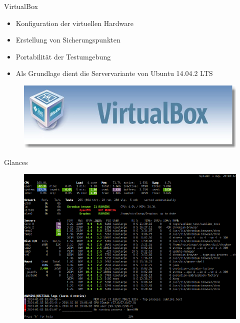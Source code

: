 \documentclass[10pt]{beamer}
\begin{document}
\begin{frame}{VirtualBox}
	\begin{itemize}
		\item Konfiguration der virtuellen Hardware
		\item Erstellung von Sicherungspunkten 
		\item Portabilität der Testumgebung
		\item Als Grundlage dient die Servervariante von Ubuntu 14.04.2 LTS
	\end{itemize}
	\begin{figure}
		\vspace{-0.5cm}
		\centering
		\includegraphics[width=\textwidth]{pic/virtual-box}
	\end{figure}	
\end{frame}


\begin{frame}{Glances}
	\begin{figure}
		\vspace{-0.5cm}
		\centering
		\includegraphics[width=\textwidth]{pic/glances}
	\end{figure}
\end{frame}
\end{document}
